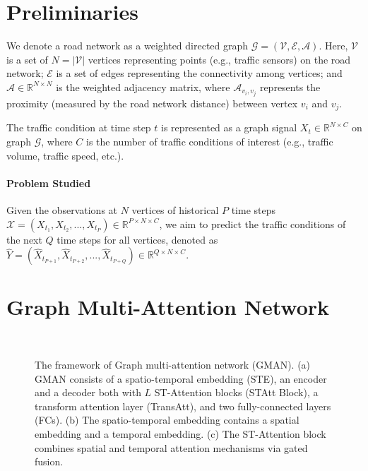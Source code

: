 \documentclass[letterpaper]{article} \usepackage{aaai20}  \usepackage{times}  \usepackage{helvet} \usepackage{courier}  \usepackage[hyphens]{url}  \usepackage{graphicx} \usepackage{amsmath}
\begin{document}
\section{Preliminaries}

We denote a road network as a weighted directed graph $ \mathcal{G=(V,E,A)} $. Here, $ \mathcal{V} $ is a set of $ N = | \mathcal{V} | $ vertices representing points (e.g., traffic sensors) on the road network; $ \mathcal{E} $ is a set of edges representing the connectivity among vertices; and $ \mathcal{A} \in \mathbb{R}^{N \times N} $ is the weighted adjacency matrix, where $ \mathcal{A}_{v_i,v_j} $ represents the proximity (measured by the road network distance) between vertex $ v_i $ and $ v_j $. 

The traffic condition at time step $ t $ is represented as a graph signal $ X_{t} \in \mathbb{R}^{N \times C} $ on graph $ \mathcal{G} $, where $ C $ is the number of traffic conditions of interest (e.g., traffic volume, traffic speed, etc.). 

\paragraph{Problem Studied} Given the observations at $ N $ vertices of historical $ P $ time steps $ \mathcal{X} = (X_{t_{1}},X_{t_{2}},...,X_{t_{P}}) \in \mathbb{R}^{P \times N \times C} $, we aim to predict the traffic conditions of the next $ Q $ time steps for all vertices, denoted as $ \hat{Y}=(\hat{X}_{t_{P+1}},\hat{X}_{t_{P+2}},...,\hat{X}_{t_{P+Q}}) \in \mathbb{R}^{Q \times N \times C} $. 

\section{Graph Multi-Attention Network}

\begin{figure}
	\centering
	\begin{minipage}{0.514 \columnwidth}
	\end{minipage}	
	\begin{minipage}{0.476 \columnwidth}
		\\
	\end{minipage}
	\caption{The framework of Graph multi-attention network (GMAN). (a) GMAN consists of a spatio-temporal embedding (STE), an encoder and a decoder both with $ L $ ST-Attention blocks (STAtt Block), a transform attention layer (TransAtt), and two fully-connected layers (FCs). (b) The spatio-temporal embedding contains a spatial embedding and a temporal embedding. (c) The ST-Attention block combines spatial and temporal attention mechanisms via gated fusion.}
	\label{Figure2}
\end{figure}
\end{document}
